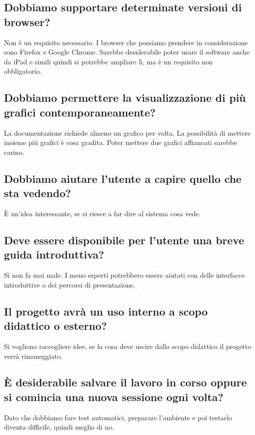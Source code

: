 \documentclass{article}
\begin{document}
    \subsection{Dobbiamo supportare determinate versioni di browser?}
    \label{sub:domanda_03}
    Non è un requisito necessario. I browser che possiamo prendere in considerazione sono Firefox e Google Chrome. Sarebbe desiderabile poter usare il software anche da iPad e simili quindi si potrebbe ampliare lì, ma è un requisito non obbligatorio.

    \subsection{Dobbiamo permettere la visualizzazione di più grafici contemporaneamente?}
    \label{sub:domanda_04}
    La documentazione richiede almeno un grafico per volta. La possibilità di mettere insieme più grafici è cosa gradita. Poter mettere due grafici affiancati sarebbe carino.

    \subsection{Dobbiamo aiutare l'utente a capire quello che sta vedendo?}
    \label{sub:domanda_05}
    È un'idea interessante, se si riesce a far dire al sistema cosa vede.

    \subsection{Deve essere disponibile per l'utente una breve guida introduttiva?}
    \label{sub:domanda_06}
    Sì non fa mai male. I meno esperti potrebbero essere aiutati con delle interfacce introduttive o dei percorsi di presentazione.

    \subsection{Il progetto avrà un uso interno a scopo didattico o esterno?}
    \label{sub:domanda_07}
    Si vogliono raccogliere idee, se la cosa deve uscire dallo scopo didattico il progetto verrà rimaneggiato.

    \subsection{È desiderabile salvare il lavoro in corso oppure si comincia una nuova sessione ogni volta?}
    \label{sub:domanda_08}
    Dato che dobbiamo fare test automatici, preparare l'ambiente e poi testarlo diventa difficile, quindi meglio di no.
    
\end{document}
